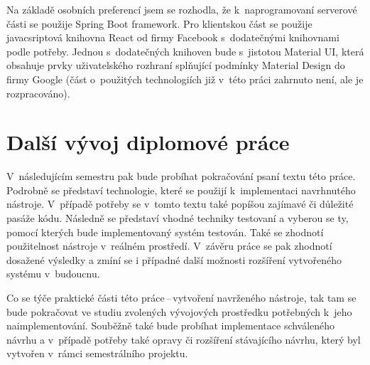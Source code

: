 Na základě osobních preferencí jsem se rozhodla, že k~naprogramovaní serverové části se použije Spring Boot framework. Pro klientskou část se použije javacsriptová knihovna React od firmy Facebook s~dodatečnými knihovnami podle potřeby. Jednou s~dodatečných knihoven bude s~jistotou Material UI, která obsahuje prvky uživatelského rozhraní splňující podmínky Material Design do firmy Google (část o~použitých technologiích již v~této práci zahrnuto není, ale je rozpracováno).

\section{Další vývoj diplomové práce}

V~následujícím semestru pak bude probíhat pokračování psaní textu této práce. Podrobně se představí technologie, které se použijí k~implementaci navrhnutého nástroje. V~případě potřeby se v~tomto textu také popíšou zajímavé či důležité pasáže kódu. Následně se představí vhodné techniky testovaní a vyberou se ty, pomocí kterých bude implementovaný systém testován. Také se zhodnotí použitelnost nástroje v~reálném prostředí. V~závěru práce se pak zhodnotí dosažené výsledky a zmíní se i případné další možnosti rozšíření vytvořeného systému v~budoucnu.

Co se týče praktické části této práce\,--\,vytvoření navrženého nástroje, tak tam se bude pokračovat ve studiu zvolených vývojových prostředku potřebných k~jeho naimplementování. Souběžně také bude probíhat implementace schváleného návrhu a v~případě potřeby také opravy či rozšíření stávajícího návrhu, který byl vytvořen v~rámci semestrálního projektu.





